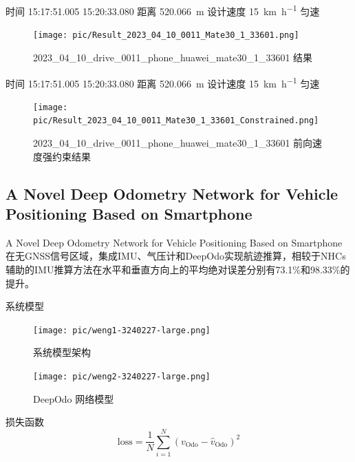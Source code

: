 \documentclass{beamer} %
\begin{document}
\begin{frame}
    时间 15:17:51.005  15:20:33.080 距离 \qty{520.066}{\meter}
    设计速度 \qty{15}{\km\per\hour} 匀速
    \begin{figure}[htbp]
        \centering
        \texttt{[image: pic/Result\_2023\_04\_10\_0011\_Mate30\_1\_33601.png]}
        \caption{2023\_04\_10\_drive\_0011\_phone\_huawei\_mate30\_1\_33601 结果}
        \label{fig:transformer-arc}
    \end{figure}
\end{frame}

\begin{frame}
    时间 15:17:51.005  15:20:33.080 距离 \qty{520.066}{\meter}
    设计速度 \qty{15}{\km\per\hour} 匀速
    \begin{figure}[htbp]
        \centering
        \texttt{[image: pic/Result\_2023\_04\_10\_0011\_Mate30\_1\_33601\_Constrained.png]}
        \caption{2023\_04\_10\_drive\_0011\_phone\_huawei\_mate30\_1\_33601 前向速度强约束结果}
        \label{fig:transformer-arc}
    \end{figure}
\end{frame}

\subsection{A Novel Deep Odometry Network for Vehicle Positioning Based on Smartphone}

\begin{frame}
    A Novel Deep Odometry Network for Vehicle Positioning Based on Smartphone  在无GNSS信号区域，集成IMU、气压计和DeepOdo实现航迹推算，相较于NHCs辅助的IMU推算方法在水平和垂直方向上的平均绝对误差分别有73.1\%和98.33\%的提升。
\end{frame}

\begin{frame}{系统模型}
    \begin{figure}[htbp]
        \centering
        \texttt{[image: pic/weng1-3240227-large.png]}
        \caption{系统模型架构}
    \end{figure}    
\end{frame}

\begin{frame}
    \begin{figure}[htbp]
        \centering
        \texttt{[image: pic/weng2-3240227-large.png]}
        \caption{DeepOdo 网络模型}
    \end{figure}
    损失函数
    \begin{equation*} \text {loss}=\frac {1}{N}\sum _{i=1}^{N} \left ({v_{\mathrm {Odo}}-\hat {v}_{\mathrm {Odo}} }\right)^{2}\end{equation*}
\end{frame}
\end{document}
